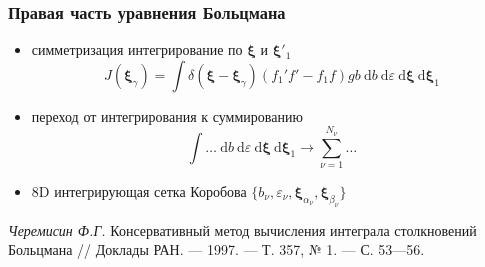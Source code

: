 \documentclass[ucs]{beamer}
\newcommand{\dd}{\:\mathrm{d}}
\begin{document}
\begin{frame}
	\frametitle{Правая часть уравнения Больцмана}
	\begin{itemize}
		\item симметризация интегрирование по \(\boldsymbol\xi\) и \(\boldsymbol\xi'_1\)
			\[
				J(\boldsymbol\xi_\gamma) = \int\delta(\boldsymbol\xi-\boldsymbol\xi_\gamma)
				(f_1' f' - f_1 f) gb \dd{b} \dd\varepsilon \dd\boldsymbol\xi \dd\boldsymbol\xi_1
			\]
		\item переход от интегрирования к суммированию
			\[ \int\dots\dd{b}\dd\varepsilon\dd\boldsymbol\xi\dd\boldsymbol\xi_1 \to \sum\limits_{\nu=1}^{N_\nu}\dots \]
		\item 8D интегрирующая сетка Коробова \( \{b_\nu,\varepsilon_\nu,\boldsymbol\xi_{\alpha_\nu},\boldsymbol\xi_{\beta_\nu}\} \)
	\end{itemize}
	\begin{block}{}
		\textit{Черемисин Ф.Г.} Консервативный метод вычисления интеграла столкновений Больцмана
			// Доклады РАН. — 1997. — Т. 357, № 1. — С. 53—56.
	\end{block}
\end{frame}
\end{document}
